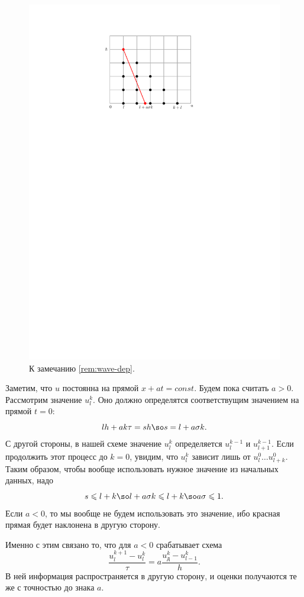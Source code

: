 \documentclass{trlnotes}
\begin{document}
    \begin{figure}[h]
        \begin{center}
            \includegraphics[scale=0.8]{../img/pde/wave-dep.pdf}
        \end{center}
        \caption{К замечанию \ref{rem:wave-dep}.}
    \end{figure}


    \begin{rem}\label{rem:wave-dep}
        Заметим, что $u$ постоянна на прямой $x + at = const$. Будем пока считать $a > 0$. Рассмотрим значение $u_l^k$. Оно должно определятся соответствущим значением на прямой $t = 0$:
        \[
            lh + ak\tau = sh \so s = l + a\sigma k.
        \]
        С другой стороны, в нашей схеме значение $u_l^k$ определяется $u_l^{k-1}$ и $u_{l+1}^{k-1}$. Если продолжить этот процесс до $k = 0$, увидим, что $u_l^k$ зависит лишь от $u^0_l\ldots u^0_{l + k}$. Таким образом, чтобы вообще использовать нужное значение из начальных данных, надо
        \[
            s \leqslant l + k \so l + a \sigma k \leqslant l + k \so a \sigma \leqslant 1.
        \]
        Если $a < 0$, то мы вообще не будем использовать это значение, ибо красная прямая будет наклонена в другую сторону.
    \end{rem}

    Именно с этим связано то, что для $a < 0$ срабатывает схема
    \[
        \dfrac{u^{k + 1}_l - u^k_l}{\tau} = a \dfrac{u^k_{д} - u^k_{l-1}}{h}.
    \]
    В ней информация распространяется в другую сторону, и оценки получаются те же с точностью до знака $a$.
\end{document}

